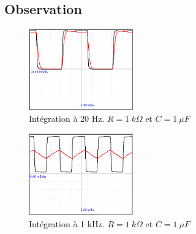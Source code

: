 \documentclass{book}
\begin{document}
\subsection{Observation}


\begin{figure}[h!]
\begin{center}
\caption{\label{fig:Effect-of-RCon-squarewave}Intégration à 20 Hz. $R = 1\ k\Omega$  et $C = 1\ \mu F$ }\vspace{0.5em}
\includegraphics[width=0.4\textwidth, height=0.3\textwidth, keepaspectratio]{Pic-squarewave-interg20hz.png}
\end{center}
\end{figure}



\begin{figure}[h!]
\begin{center}
\caption{\label{fig:Effect-of-RCon-squarewave2}Intégration à 1 kHz. $R = 1\ k\Omega$  et $C = 1\ \mu F$ }\vspace{0.5em}
\includegraphics[width=0.4\textwidth, height=0.3\textwidth, keepaspectratio]{Pic-squarewave-interg1khz.png}
\end{center}
\end{figure}
\end{document}

